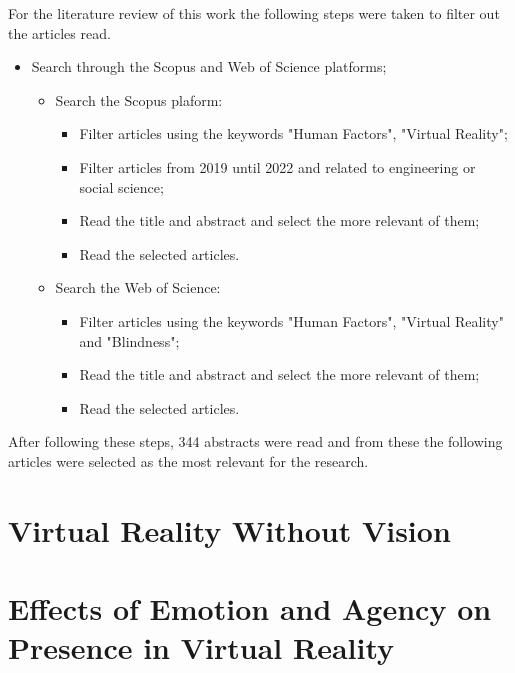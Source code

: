 For the literature review of this work the following steps were taken to filter out the articles read.
\begin{itemize}
    \item Search through the Scopus and Web of Science platforms;
    \begin{itemize}
        \item Search the Scopus plaform:
        \begin{itemize}
            \item Filter articles using the keywords "Human Factors", "Virtual Reality";
            \item Filter articles from 2019 until 2022 and related to engineering or social science;
            \item Read the title and abstract and select the more relevant of them;
            \item Read the selected articles.
        \end{itemize}
        \item Search the Web of Science:
        \begin{itemize}
            \item Filter articles using the keywords "Human Factors", "Virtual Reality" and "Blindness";
            \item Read the title and abstract and select the more relevant of them;
            \item Read the selected articles.
        \end{itemize}
    \end{itemize}
\end{itemize}

After following these steps, 344 abstracts were read and from these the following articles were selected as the most relevant for the research.

\section{Virtual Reality Without Vision}
\label{sec:vr_without_vision}


\section{Effects of Emotion and Agency on Presence in Virtual Reality}
\label{sec:emotion_presence_vr}


